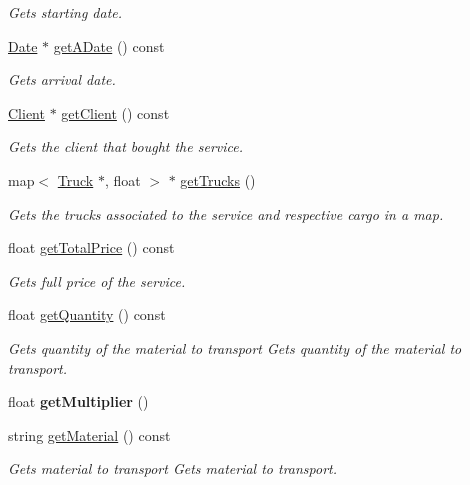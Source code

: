 \begin{DoxyCompactItemize}
\begin{DoxyCompactList}\small\item\em Gets starting date. \end{DoxyCompactList}\item 
\hyperlink{class_date}{Date} $\ast$ \hyperlink{class_service_a2b08c3d53ab2246eb3cca649c2baa100}{get\+A\+Date} () const
\begin{DoxyCompactList}\small\item\em Gets arrival date. \end{DoxyCompactList}\item 
\hyperlink{class_client}{Client} $\ast$ \hyperlink{class_service_a4a9cc0a45f030f69b3d6468df5d02aaa}{get\+Client} () const
\begin{DoxyCompactList}\small\item\em Gets the client that bought the service. \end{DoxyCompactList}\item 
map$<$ \hyperlink{class_truck}{Truck} $\ast$, float $>$ $\ast$ \hyperlink{class_service_a48898f98adbbaec9d3a1cbdfd88b2137}{get\+Trucks} ()
\begin{DoxyCompactList}\small\item\em Gets the trucks associated to the service and respective cargo in a map. \end{DoxyCompactList}\item 
float \hyperlink{class_service_ac5dca2c1b78ff990827554d4ac9c5990}{get\+Total\+Price} () const
\begin{DoxyCompactList}\small\item\em Gets full price of the service. \end{DoxyCompactList}\item 
float \hyperlink{class_service_aceff76eb1aba00c9c74eb98d56771a6a}{get\+Quantity} () const
\begin{DoxyCompactList}\small\item\em Gets quantity of the material to transport Gets quantity of the material to transport. \end{DoxyCompactList}\item 
\mbox{\label{class_service_a924ea5df81fa28e96b5ef02bad0d6d7f}} 
float {\bfseries get\+Multiplier} ()
\item 
string \hyperlink{class_service_a92be216e9c710b28bc4046353884b3e2}{get\+Material} () const
\begin{DoxyCompactList}\small\item\em Gets material to transport Gets material to transport. \end{DoxyCompactList}\item 

\end{DoxyCompactItemize}
